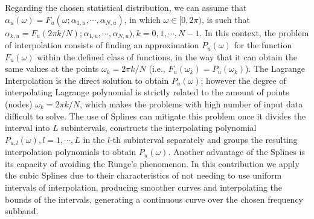 \documentclass[journal]{IEEEtran}
\begin{document}
Regarding the chosen statistical distribution, we can assume that $\alpha_u (\omega) = F_u(\omega; \alpha_{1,u}, \cdots, \alpha_{N,u})$, in which $\omega \in [0,2\pi)$, is such that $\alpha_{k,u} = F_u(2\pi k/N); \alpha_{1,u}, \cdots, \alpha_{N,u}),k=0,1,\cdots,N-1$. In this context, the problem of interpolation consists of finding an approximation $P_u(\omega)$ for the function $F_u(\omega)$ within the defined class of functions, in the way that it can obtain the same values at the points $\omega_k = 2\pi k/N$ (i.e., $F_u(\omega_k)=P_u(\omega_k)$). The Lagrange Interpolation is the direct solution to obtain $P_u(\omega)$; however the degree of interpolating Lagrange polynomial is strictly related to the amount of points (nodes)  $\omega_k = 2\pi k/N$, which makes the problems with high number of input data difficult to solve. The use of Splines can mitigate this problem once it divides the interval into $L$ subintervals, constructs the interpolating polynomial $P_{u,l}(\omega),l=1,\cdots,L$ in the $l$-th subinterval separately and groups the resulting interpolation polynomials to obtain $P_u(\omega)$. Another advantage of the Splines is its capacity of avoiding the Runge's phenomenon. In this contribution we apply the cubic Splines \cite{Spline} due to their characteristics of not needing to use uniform intervals of interpolation, producing smoother curves and interpolating the bounds of the intervals, generating a continuous curve over the chosen frequency subband. 
\end{document}
